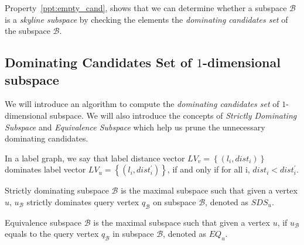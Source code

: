 Property~\ref{ppt:empty_cand}, shows that we can determine whether a subspace $\mathcal{B}$ is a \emph{skyline subspace} by checking the elements the \emph{dominating candidates set} of the subspace $\mathcal{B}$.


\subsection{Dominating Candidates Set of $1$-dimensional subspace}

We will introduce an algorithm to compute the \emph{dominating candidates set} of $1$-dimensional subspace. We will also introduce the concepts of \emph{Strictly Dominating Subspace} and \emph{Equivalence Subspace} which help us prune the unnecessary dominating candidates.

\begin{definition}
In a label graph, we say that label distance vector $LV_v=\left\{(l_i, dist_i)\right\}$ dominates label vector $LV_u=\left\{(l_i, dist_i^\prime)\right\}$, if and only if for all i, $dist_i < dist_i^\prime$.
\end{definition}

\begin{definition}
Strictly dominating subspace $\mathcal{B}$ is the maximal subspace such that given a vertex $u$, $u_\mathcal{B}$ strictly dominates query vertex $q_\mathcal{B}$ on subspace $\mathcal{B}$, denoted as $\mathit{SDS}_u$.
\end{definition}

\begin{definition}
Equivalence subspace $\mathcal{B}$ is the maximal subspace such that given a vertex $u$, if $u_\mathcal{B}$ equals to the query vertex $q_\mathcal{B}$ in subspace $\mathcal{B}$, denoted as $\mathit{EQ}_u$.
\end{definition}

